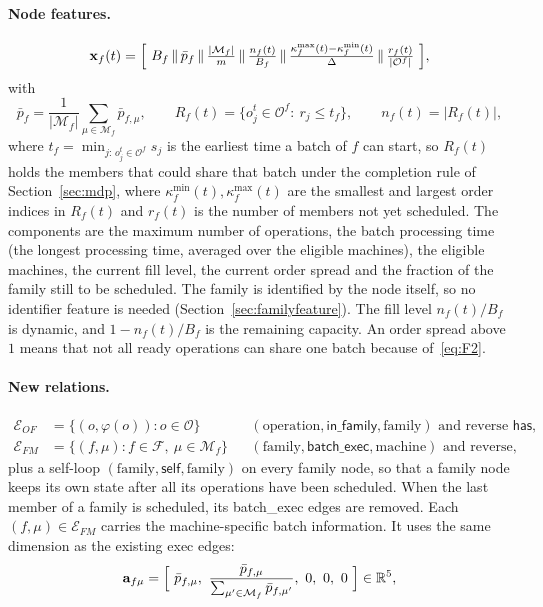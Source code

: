 \documentclass[11pt,a4paper]{article}
\newcommand{\Oset}{\mathcal{O}}
\newcommand{\Mset}{\mathcal{M}}
\newcommand{\Fset}{\mathcal{F}}
\newcommand{\Eset}{\mathcal{E}}
\newcommand{\cat}{\,\Vert\,}
\newcommand{\R}{\mathbb{R}}
\begin{document}
\paragraph{Node features.}
\begin{equation}
  \mathbf{x}_f(t)=\Bigl[\ B_f \cat \bar p_f \cat \tfrac{|\Mset_f|}{m} \cat \tfrac{n_f(t)}{B_f} \cat \tfrac{\kappa^{\max}_f(t)-\kappa^{\min}_f(t)}{\Delta} \cat \tfrac{r_f(t)}{|\Oset^f|}\ \Bigr],
  \label{eq:xfam}
\end{equation}
with
\begin{equation}
  \bar p_f=\frac{1}{|\Mset_f|}\sum_{\mu\in\Mset_f}\bar p_{f,\mu},\qquad
  R_f(t)=\{o_j^t\in\Oset^f:\ r_j\le t_f\},\qquad
  n_f(t)=|R_f(t)|,
\end{equation}
where $t_f=\min_{j:\,o_j^t\in\Oset^f} s_j$ is the earliest time a batch of $f$
can start, so $R_f(t)$ holds the members that could share that batch under the
completion rule of Section~\ref{sec:mdp},
where $\kappa^{\min}_f(t),\kappa^{\max}_f(t)$ are the smallest and largest order
indices in $R_f(t)$ and $r_f(t)$ is the number of members not yet scheduled. The
components are the maximum number of operations, the batch processing time (the
longest processing time, averaged over the eligible machines), the eligible
machines, the current fill level, the current order spread and the fraction of
the family still to be scheduled. The family is identified by the node itself,
so no identifier feature is needed (Section~\ref{sec:familyfeature}). The fill
level $n_f(t)/B_f$ is dynamic, and $1-n_f(t)/B_f$ is the remaining capacity. An
order spread above $1$ means that not all ready operations can share one batch
because of~\eqref{eq:F2}.

\paragraph{New relations.}
\begin{align}
  \Eset_{OF} &= \{(o,\varphi(o)) : o\in\Oset\}
  && (\text{operation},\textsf{in\_family},\text{family}) \text{ and reverse } \textsf{has},\\
  \Eset_{FM} &= \{(f,\mu) : f\in\Fset,\ \mu\in\Mset_f\}
  && (\text{family},\textsf{batch\_exec},\text{machine}) \text{ and reverse},
\end{align}
plus a self-loop $(\text{family},\textsf{self},\text{family})$ on every family node,
so that a family node keeps its own state after all its operations have been
scheduled. When the last member of a family is scheduled, its
\textsf{batch\_exec} edges are removed.
Each $(f,\mu)\in\Eset_{FM}$ carries the machine-specific batch information. It uses
the same dimension as the existing \textsf{exec} edges:
\begin{equation}
  \mathbf{a}_{f\mu}=\Bigl[\ \bar p_{f,\mu},\ \frac{\bar p_{f,\mu}}{\sum_{\mu'\in\Mset_f}\bar p_{f,\mu'}},\ 0,\ 0,\ 0\ \Bigr]\in\R^5,
\end{equation}
\end{document}
